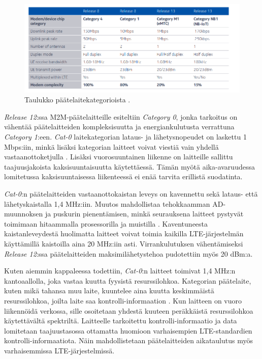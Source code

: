 \documentclass[finnish, 12pt, a4paper, elec, latin1, utf8, online]{aaltothesis}
\begin{document}
\begin{figure}[h!]
    \centering
    \includegraphics[width=\linewidth]{Images/Kategoriat.png}
    \caption{Taulukko päätelaitekategorioista \cite{nokiawhitepaper}.}
    \label{fig:kategoria}
\end{figure}

\textit{Release 12}:ssa \cite{release12} M2M-päätelaitteille esiteltiin \textit{Category 0}, jonka tarkoitus on vähentää päätelaitteiden kompleksisuutta ja energiankulutusta verrattuna \textit{Category 1}:een. \textit{Cat-0} laitekategorian lataus- ja lähetysnopeudet on laskettu 1 Mbps:iin, minkä lisäksi kategorian laitteet voivat viestiä vain yhdellä vastaanottoketjulla \cite{gsmawhitepaper}. Lisäksi vuorosuuntainen liikenne on laitteille sallittu taajuusjakoista kaksisuuntaisuutta käytettäessä. Tämän myötä aika-avaruudessa lomitetussa kaksisuuntaisessa liikenteessä ei enää tarvita erillistä suodatinta.

\textit{Cat-0}:n päätelaitteiden vastaanottokaistan leveys on kavennettu sekä lataus- että lähetyskaistalla 1,4 MHz:iin. Muutos mahdollistaa tehokkaamman AD-muunnoksen ja puskurin pienentämisen, minkä seurauksena laitteet pystyvät toimimaan hitaammalla prosessorilla ja muistilla \cite{nokiawhitepaper}. Kaventuneesta kaistanleveydestä huolimatta laitteet voivat toimia kaikilla LTE-järjestelmän käyttämillä kaistoilla aina 20 MHz:iin asti. Virrankulutuksen vähentämiseksi \textit{Release 12}:ssa päätelaitteiden maksimilähetystehoa pudotettiin myös 20 dBm:a.

Kuten aiemmin kappaleessa todettiin, \textit{Cat-0}:n laitteet toimivat 1,4 MHz:n kantoaallolla, joka vastaa kuutta fyysistä resurssilohkoa. Kategorian päätelaite, kuten mikä tahansa muu laite, kuuntelee aina kuutta keskimmäistä resurssilohkoa, joilta laite saa kontrolli-informaation \cite{nokiawhitepaper}. Kun laitteen on vuoro liikennöidä verkossa, sille osoitetaan yhdestä kuuteen peräkkäistä resurssilohkoa käytettävältä spektriltä. Laitteelle tarkoitettu kontrolli-informaatio ja data lomitetaan taajuustasossa ottamatta huomioon varhaisempien LTE-standardien kontrolli-informaatiota. Näin mahdollistetaan päätelaitteiden aikataulutus myös varhaisemmissa LTE-järjestelmissä.
\end{document}
